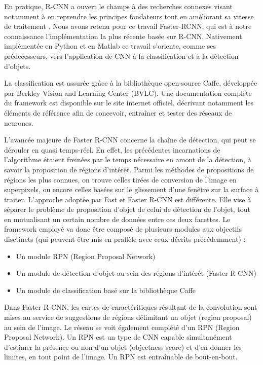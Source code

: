       En pratique, R-CNN a ouvert le champs à des recherches connexes visant notamment à en reprendre les principes fondateurs tout en améliorant sa vitesse de traitement \cite{Bib_FastRCNN}. 
      Nous avons retenu pour ce travail Faster-RCNN\cite{Bib_FasterRCNN}, qui est à notre connaissance l'implémentation la plus récente basée sur R-CNN. 
      Nativement implémentée en Python et en Matlab ce travail s'oriente, comme ses prédecesseurs, vers l'application de CNN à la classification et à la détection d'objets.  
      
      La classification est assurée grâce à la bibliothèque open-source Caffe, développée
      par Berkley Vision and Learning Center (BVLC)\cite{Bib_CaffeHome}. Une documentation complète du framework est disponible sur le site internet 
      officiel\cite{Bib_CaffeTuto}, décrivant notamment les éléments de référence afin de concevoir, entraîner et tester des réseaux de neurones. 
      
      L'avancée majeure de Faster R-CNN concerne la chaîne de détection, qui peut se dérouler en quasi temps-réel. 
      En effet, les précédentes incarnations de l'algorithme étaient freinées par le temps nécessaire en amont de la détection, à savoir la proposition de régions d'intérêt. 
      Parmi les méthodes de propositions de régions les plus connues, on trouve celles tirées de conversion de l'image en superpixels, ou encore celles basées sur le glissement d'une fenêtre sur la surface à traiter. 
      L'approche adoptée par Fast et Faster R-CNN est différente. 
      Elle vise à séparer le problème de proposition d'objet de celui de détection de l'objet, tout en mutualisant un certain nombre de données entre ces deux facettes. 
      Le framework employé va donc être composé de plusieurs modules aux objectifs disctincts (qui peuvent être mis en prallèle avec ceux décrits précédemment) : 
      
      \begin{itemize}
       \item Un module RPN (Region Proposal Network)
       \item Un module de détection d'objet au sein des régions d'intérêt (Faster R-CNN) 
       \item Un module de classification basé sur la bibliothèque Caffe
      \end{itemize}
      
      Dans Faster R-CNN, les cartes de caractéritiques résultant de la convolution sont mises au service de suggestions de régions délimitant un objet (region proposal) au sein de l'image. Le réseau se voit également
      complété d'un RPN (Region Proposal Network). Un RPN est un type de CNN capable simultanément d'estimer la présence ou non d'un objet (objectness score) et d'en donner les limites, en tout point de l'image.
      Un RPN est entraînable de bout-en-bout. 
      
